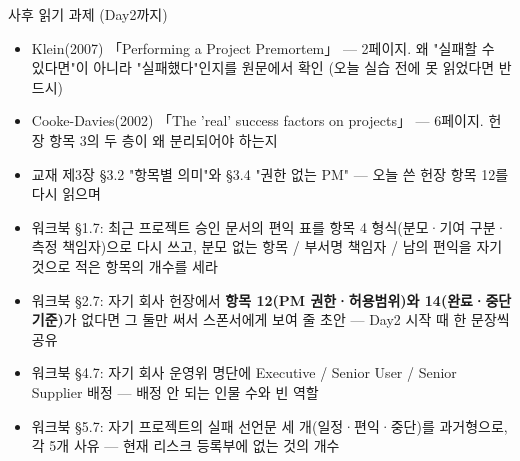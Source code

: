 \begin{frame}[allowframebreaks=1.0]{사후 읽기 과제 (Day2까지)}
\small
\par\smallskip{}\nobreak
\begin{itemize}
\item\relax Klein(2007) 「Performing a Project Premortem」 — 2페이지. 왜 "실패할 수 있다면"이 아니라 "실패했다"인지를 원문에서 확인 (오늘 실습 전에 못 읽었다면 반드시)
\item\relax Cooke-Davies(2002) 「The 'real' success factors on projects」 — 6페이지. 헌장 항목 3의 두 층이 왜 분리되어야 하는지
\item\relax 교재 제3장 §3.2 "항목별 의미"와 §3.4 "권한 없는 PM" — 오늘 쓴 헌장 항목 12를 다시 읽으며
\end{itemize}
\par\smallskip{}\nobreak
\begin{itemize}
\item\relax 워크북 §1.7: 최근 프로젝트 승인 문서의 편익 표를 항목 4 형식(분모·기여 구분·측정 책임자)으로 다시 쓰고, 분모 없는 항목 / 부서명 책임자 / 남의 편익을 자기 것으로 적은 항목의 개수를 세라
\item\relax 워크북 §2.7: 자기 회사 헌장에서 \textbf{항목 12(PM 권한·허용범위)와 14(완료·중단 기준)}가 없다면 그 둘만 써서 스폰서에게 보여 줄 초안 — Day2 시작 때 한 문장씩 공유
\item\relax 워크북 §4.7: 자기 회사 운영위 명단에 Executive / Senior User / Senior Supplier 배정 — 배정 안 되는 인물 수와 빈 역할
\item\relax 워크북 §5.7: 자기 프로젝트의 실패 선언문 세 개(일정·편익·중단)를 과거형으로, 각 5개 사유 — 현재 리스크 등록부에 없는 것의 개수
\end{itemize}
\par\smallskip{}\nobreak
\par\smallskip{}\nobreak

\end{frame}
